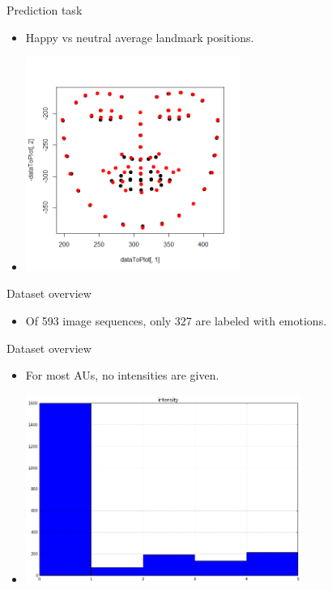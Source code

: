 \documentclass[xcolor=dvipsnames]{beamer}
\begin{document}
\begin{frame}{Prediction task}
  \begin{itemize}
    \item Happy vs neutral average landmark positions.
    \item[] \includegraphics[height=7cm]{happy_vs_neutral}
  \end{itemize}
\end{frame}

\begin{frame}{Dataset overview}
  \begin{itemize}
    \item Of 593 image sequences, only 327 are labeled with emotions.
  \end{itemize}
\end{frame}

\begin{frame}{Dataset overview}
  \begin{itemize}
    \item For most AUs, no intensities are given.
    \item[] \includegraphics[width=9cm]{au_intensity_histogram}
  \end{itemize}
\end{frame}
\end{document}
